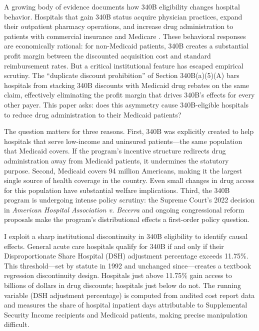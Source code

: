 \documentclass[12pt]{article}
\begin{document}
A growing body of evidence documents how 340B eligibility changes hospital behavior. Hospitals that gain 340B status acquire physician practices, expand their outpatient pharmacy operations, and increase drug administration to patients with commercial insurance and Medicare \citep{nikpay2018effect, desai2020association, huang2024biosimilar}. These behavioral responses are economically rational: for non-Medicaid patients, 340B creates a substantial profit margin between the discounted acquisition cost and standard reimbursement rates. But a critical institutional feature has escaped empirical scrutiny. The ``duplicate discount prohibition'' of Section 340B(a)(5)(A) bars hospitals from stacking 340B discounts with Medicaid drug rebates on the same claim, effectively eliminating the profit margin that drives 340B's effects for every other payer. This paper asks: does this asymmetry cause 340B-eligible hospitals to reduce drug administration to their Medicaid patients?

The question matters for three reasons. First, 340B was explicitly created to help hospitals that serve low-income and uninsured patients---the same population that Medicaid covers. If the program's incentive structure redirects drug administration away from Medicaid patients, it undermines the statutory purpose. Second, Medicaid covers 94 million Americans, making it the largest single source of health coverage in the country. Even small changes in drug access for this population have substantial welfare implications. Third, the 340B program is undergoing intense policy scrutiny: the Supreme Court's 2022 decision in \textit{American Hospital Association v. Becerra} and ongoing congressional reform proposals make the program's distributional effects a first-order policy question.

I exploit a sharp institutional discontinuity in 340B eligibility to identify causal effects. General acute care hospitals qualify for 340B if and only if their Disproportionate Share Hospital (DSH) adjustment percentage exceeds 11.75\%. This threshold---set by statute in 1992 and unchanged since---creates a textbook regression discontinuity design. Hospitals just above 11.75\% gain access to billions of dollars in drug discounts; hospitals just below do not. The running variable (DSH adjustment percentage) is computed from audited cost report data and measures the share of hospital inpatient days attributable to Supplemental Security Income recipients and Medicaid patients, making precise manipulation difficult.
\end{document}
